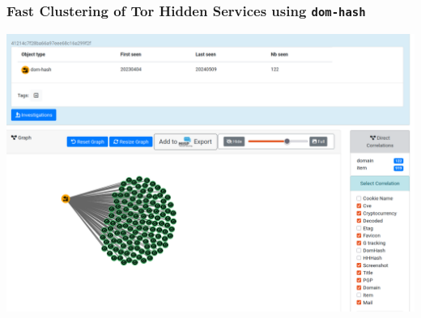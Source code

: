 \documentclass[10pt,aspectratio=169, colorlinks=true, linkcolor=circlBlue]{beamer}
\begin{document}
\begin{frame}
    \frametitle{Fast Clustering of Tor Hidden Services using \texttt{dom-hash}}

    \begin{center}
        \includegraphics[scale=0.20]{./img/dom-hash.png}
    \end{center}

\end{frame}
\end{document}
